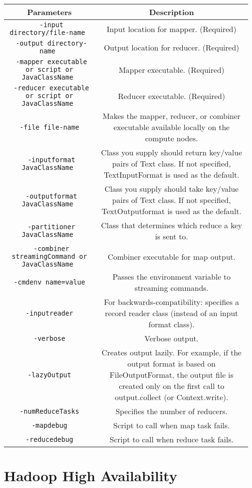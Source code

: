 \begin{center}
\begin{tabular}{|c|c|} \hline
	\textbf{Parameters	} &	\textbf{Description}	\\ \hline
\texttt{ -input directory/file-name	} &	Input location for mapper. (Required)	\\ \hline
\texttt{ -output directory-name	} &	Output location for reducer. (Required)	\\ \hline
\texttt{ -mapper executable or script or JavaClassName	} &	Mapper executable. (Required)	\\ \hline
\texttt{ -reducer executable or script or JavaClassName	} &	Reducer executable. (Required)	\\ \hline
\texttt{ -file file-name	} &	Makes the mapper, reducer, or combiner executable available locally on the compute nodes.	\\ \hline
\texttt{ -inputformat JavaClassName	} &	Class you supply should return key/value pairs of Text class. If not specified, TextInputFormat is used as the default.	\\ \hline
\texttt{ -outputformat JavaClassName	} &	Class you supply should take key/value pairs of Text class. If not specified, TextOutputformat is used as the default.	\\ \hline
\texttt{ -partitioner JavaClassName	} &	Class that determines which reduce a key is sent to.	\\ \hline
\texttt{ -combiner streamingCommand or JavaClassName	} &	Combiner executable for map output.	\\ \hline
\texttt{ -cmdenv name=value	} &	Passes the environment variable to streaming commands.	\\ \hline
\texttt{ -inputreader	} &	For backwards-compatibility: specifies a record reader class (instead of an input format class).	\\ \hline
\texttt{ -verbose	} &	Verbose output.	\\ \hline
\texttt{ -lazyOutput	} &	Creates output lazily. For example, if the output format is based on FileOutputFormat, the output file is created only on the first call to output.collect (or Context.write).	\\ \hline
\texttt{ -numReduceTasks	} &	Specifies the number of reducers.	\\ \hline
\texttt{ -mapdebug	} &	Script to call when map task fails.	\\ \hline
\texttt{ -reducedebug	} &	Script to call when reduce task fails.	\\ \hline
\end{tabular}
\end{center}

\section{Hadoop High Availability}
